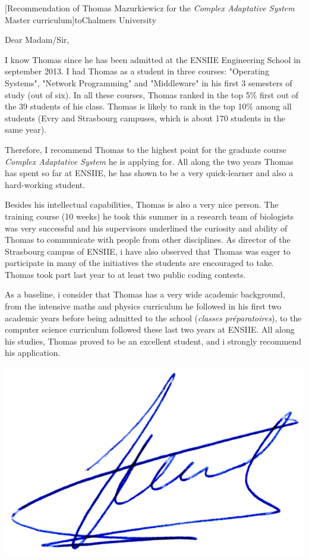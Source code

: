 \documentclass[a4paper,10pt]{article}
\begin{document}

\begin{letter}[Recommendation of Thomas Mazurkiewicz for the \emph{Complex Adaptative System} Master curriculum]{to}{Chalmers University}

Dear Madam/Sir, 

I know Thomas since he has been admitted at the ENSIIE Engineering School in september 2013.
%
I had Thomas as a student in three courses: "Operating Systems",
 "Network Programming" and "Middleware" in his first 3 semesters 
of study (out of six). In all these courses, Thomas ranked in the top 
5\% first out of the  39 students of his class.  Thomas is likely to 
rank in the top 10\%  among all students (Evry and Strasbourg
campuses, which is about 170 students in the same year). 

Therefore, I recommend Thomas to the highest point for the graduate 
course \textit{Complex Adaptative System} he is applying for. 
All along the two years Thomas has spent so far at ENSIIE, he has shown
to be a very quick-learner and also a hard-working student.

Besides his intellectual capabilities, Thomas is also a
 very nice person. The training course (10 weeks) he took this summer in
a research team of biologists was very successful and his supervisors underlined
the curiosity and ability of Thomas to communicate with people from other disciplines.
As director  of the Strasbourg campus of ENSIIE, i have also observed that Thomas
was eager to participate in many of the initiatives the students are encouraged
to take. Thomas took part last year to at least two public coding contests.

As a baseline, i consider that Thomas has a very wide academic background,
from the intensive maths and physics curriculum he followed in his first two
academic years before being admitted to the school (\emph{classes
  préparatoires}), to the computer science curriculum followed these last
two years at ENSIIE. All along his studies, Thomas proved to be an excellent 
student, and i strongly recommend his application.



\end{letter}
\begin{flushright}
\includegraphics[width=.26\textwidth]{signgenaud.jpg}
\end{flushright}
\end{document}
